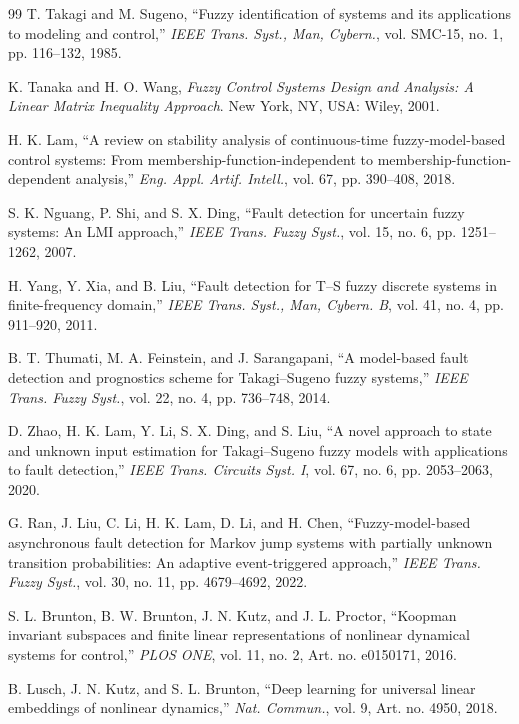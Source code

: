 \documentclass[journal]{IEEEtran}
\newcommand{\1}{\bm 1}
\begin{document}
\begin{thebibliography}{99}
T. Takagi and M. Sugeno, ``Fuzzy identification of systems and its
applications to modeling and control,'' \emph{IEEE Trans. Syst., Man,
Cybern.}, vol. SMC-15, no. 1, pp. 116--132, 1985.

K. Tanaka and H. O. Wang, \emph{Fuzzy Control Systems Design and Analysis:
A Linear Matrix Inequality Approach}. New York, NY, USA: Wiley, 2001.

H. K. Lam, ``A review on stability analysis of continuous-time
fuzzy-model-based control systems: From membership-function-independent to
membership-function-dependent analysis,'' \emph{Eng. Appl. Artif. Intell.},
vol. 67, pp. 390--408, 2018.

S. K. Nguang, P. Shi, and S. X. Ding, ``Fault detection for uncertain fuzzy
systems: An LMI approach,'' \emph{IEEE Trans. Fuzzy Syst.}, vol. 15, no. 6,
pp. 1251--1262, 2007.

H. Yang, Y. Xia, and B. Liu, ``Fault detection for T--S fuzzy discrete
systems in finite-frequency domain,'' \emph{IEEE Trans. Syst., Man, Cybern.
B}, vol. 41, no. 4, pp. 911--920, 2011.

B. T. Thumati, M. A. Feinstein, and J. Sarangapani, ``A model-based fault
detection and prognostics scheme for Takagi--Sugeno fuzzy systems,''
\emph{IEEE Trans. Fuzzy Syst.}, vol. 22, no. 4, pp. 736--748, 2014.

D. Zhao, H. K. Lam, Y. Li, S. X. Ding, and S. Liu, ``A novel approach to
state and unknown input estimation for Takagi--Sugeno fuzzy models with
applications to fault detection,'' \emph{IEEE Trans. Circuits Syst. I},
vol. 67, no. 6, pp. 2053--2063, 2020.

G. Ran, J. Liu, C. Li, H. K. Lam, D. Li, and H. Chen,
``Fuzzy-model-based asynchronous fault detection for Markov jump systems
with partially unknown transition probabilities: An adaptive event-triggered
approach,'' \emph{IEEE Trans. Fuzzy Syst.}, vol. 30, no. 11,
pp. 4679--4692, 2022.

S. L. Brunton, B. W. Brunton, J. N. Kutz, and J. L. Proctor,
``Koopman invariant subspaces and finite linear representations of nonlinear
dynamical systems for control,'' \emph{PLOS ONE}, vol. 11, no. 2,
Art. no. e0150171, 2016.

B. Lusch, J. N. Kutz, and S. L. Brunton, ``Deep learning for universal
linear embeddings of nonlinear dynamics,'' \emph{Nat. Commun.}, vol. 9,
Art. no. 4950, 2018.


\end{thebibliography}
\end{document}
